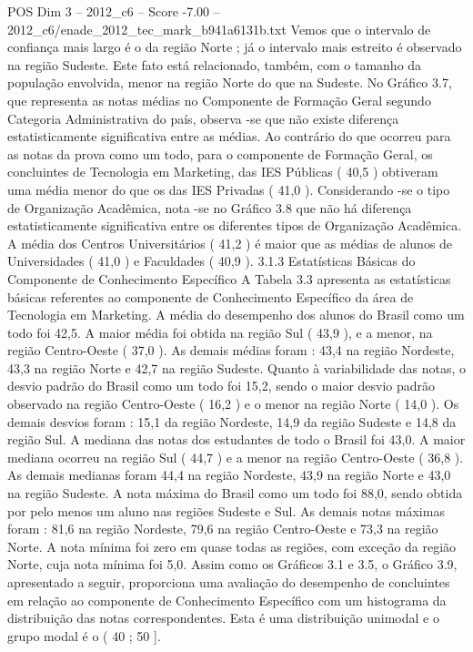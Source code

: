 \begin{textsample}{POS Dim 3 – 2012\_c6 – Score -7.00 – 2012\_c6/enade\_2012\_tec\_mark\_b941a6131b.txt}
Vemos que o intervalo de confiança mais largo é o da região Norte ; já o intervalo mais estreito é observado na região Sudeste.
Este fato está relacionado, também, com o tamanho da população envolvida, menor na região Norte do que na Sudeste.
No Gráfico 3.7, que representa as notas médias no Componente de Formação Geral segundo Categoria Administrativa do país, observa -se que não existe diferença estatisticamente significativa entre as médias.
Ao contrário do que ocorreu para as notas da prova como um todo, para o componente de Formação Geral, os concluintes de Tecnologia em Marketing, das IES Públicas ( 40,5 ) obtiveram uma média menor do que os das IES Privadas ( 41,0 ).
Considerando -se o tipo de Organização Acadêmica, nota -se no Gráfico 3.8 que não há diferença estatisticamente significativa entre os diferentes tipos de Organização Acadêmica.
A média dos Centros Universitários ( 41,2 ) é maior que as médias de alunos de Universidades ( 41,0 ) e Faculdades ( 40,9 ). 3.1.3 Estatísticas Básicas do Componente de Conhecimento Específico A Tabela 3.3 apresenta as estatísticas básicas referentes ao componente de Conhecimento Específico da área de Tecnologia em Marketing.
A média do desempenho dos alunos do Brasil como um todo foi 42,5.
A maior média foi obtida na região Sul ( 43,9 ), e a menor, na região Centro-Oeste ( 37,0 ).
As demais médias foram : 43,4 na região Nordeste, 43,3 na região Norte e 42,7 na região Sudeste.
Quanto à variabilidade das notas, o desvio padrão do Brasil como um todo foi 15,2, sendo o maior desvio padrão observado na região Centro-Oeste ( 16,2 ) e o menor na região Norte ( 14,0 ).
Os demais desvios foram : 15,1 da região Nordeste, 14,9 da região Sudeste e 14,8 da região Sul.
A mediana das notas dos estudantes de todo o Brasil foi 43,0.
A maior mediana ocorreu na região Sul ( 44,7 ) e a menor na região Centro-Oeste ( 36,8 ).
As demais medianas foram 44,4 na região Nordeste, 43,9 na região Norte e 43,0 na região Sudeste.
A nota máxima do Brasil como um todo foi 88,0, sendo obtida por pelo menos um aluno nas regiões Sudeste e Sul.
As demais notas máximas foram : 81,6 na região Nordeste, 79,6 na região Centro-Oeste e 73,3 na região Norte.
A nota mínima foi zero em quase todas as regiões, com exceção da região Norte, cuja nota mínima foi 5,0.
Assim como os Gráficos 3.1 e 3.5, o Gráfico 3.9, apresentado a seguir, proporciona uma avaliação do desempenho de concluintes em relação ao componente de Conhecimento Específico com um histograma da distribuição das notas correspondentes.
Esta é uma distribuição unimodal e o grupo modal é o ( 40 ; 50 ].

\end{textsample}
